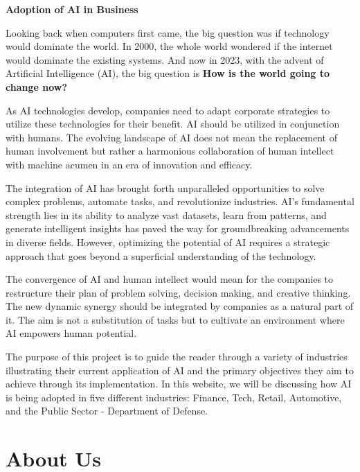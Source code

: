 \documentclass[
]{article}
\begin{document}
\textbf{Adoption of AI in Business}

Looking back when computers first came, the big question was if technology would dominate the world. In 2000, the whole world wondered if the internet would dominate the existing systems. And now in 2023, with the advent of Artificial Intelligence (AI), the big question is \textbf{How is the world going to change now?}

As AI technologies develop, companies need to adapt corporate strategies to utilize these technologies for their benefit. AI should be utilized in conjunction with humans. The evolving landscape of AI does not mean the replacement of human involvement but rather a harmonious collaboration of human intellect with machine acumen in an era of innovation and efficacy.

The integration of AI has brought forth unparalleled opportunities to solve complex problems, automate tasks, and revolutionize industries. AI's fundamental strength lies in its ability to analyze vast datasets, learn from patterns, and generate intelligent insights has paved the way for groundbreaking advancements in diverse fields. However, optimizing the potential of AI requires a strategic approach that goes beyond a superficial understanding of the technology.

The convergence of AI and human intellect would mean for the companies to restructure their plan of problem solving, decision making, and creative thinking. The new dynamic synergy should be integrated by companies as a natural part of it. The aim is not a substitution of tasks but to cultivate an environment where AI empowers human potential.

The purpose of this project is to guide the reader through a variety of industries illustrating their current application of AI and the primary objectives they aim to achieve through its implementation. In this website, we will be discussing how AI is being adopted in five different industries: Finance, Tech, Retail, Automotive, and the Public Sector - Department of Defense.

\hypertarget{about-us}{%
\section{About Us}\label{about-us}}
\end{document}
